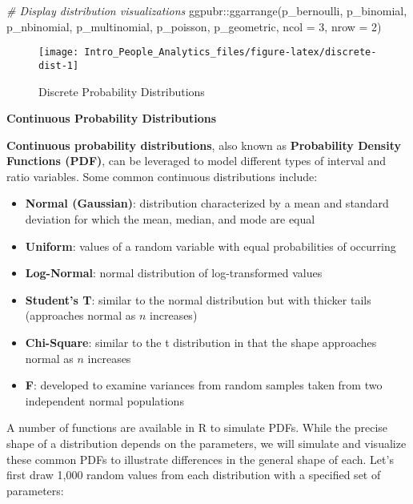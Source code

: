 \documentclass[
]{book}
\newenvironment{Shaded}{\begin{snugshade}}{\end{snugshade}}
\newcommand{\AttributeTok}[1]{\textcolor[rgb]{0.77,0.63,0.00}{#1}}
\newcommand{\CommentTok}[1]{\textcolor[rgb]{0.56,0.35,0.01}{\textit{#1}}}
\newcommand{\DecValTok}[1]{\textcolor[rgb]{0.00,0.00,0.81}{#1}}
\newcommand{\FunctionTok}[1]{\textcolor[rgb]{0.00,0.00,0.00}{#1}}
\newcommand{\NormalTok}[1]{#1}
\newcommand{\SpecialCharTok}[1]{\textcolor[rgb]{0.00,0.00,0.00}{#1}}
\providecommand{\tightlist}{%
  \setlength{\itemsep}{0pt}\setlength{\parskip}{0pt}}
\begin{document}
\begin{Shaded}
\begin{Highlighting}[]
\CommentTok{\# Display distribution visualizations}
\NormalTok{ggpubr}\SpecialCharTok{::}\FunctionTok{ggarrange}\NormalTok{(p\_bernoulli, p\_binomial, p\_nbinomial, p\_multinomial, p\_poisson, p\_geometric,}
          \AttributeTok{ncol =} \DecValTok{3}\NormalTok{, }\AttributeTok{nrow =} \DecValTok{2}\NormalTok{)}
\end{Highlighting}
\end{Shaded}

\begin{figure}

{\centering \texttt{[image: Intro\_People\_Analytics\_files/figure-latex/discrete-dist-1]} 

}

\caption{Discrete Probability Distributions}\label{fig:discrete-dist}
\end{figure}

\textbf{Continuous Probability Distributions}

\textbf{Continuous probability distributions}, also known as \textbf{Probability Density Functions (PDF)}, can be leveraged to model different types of interval and ratio variables. Some common continuous distributions include:

\begin{itemize}
\tightlist
\item
  \textbf{Normal (Gaussian)}: distribution characterized by a mean and standard deviation for which the mean, median, and mode are equal
\item
  \textbf{Uniform}: values of a random variable with equal probabilities of occurring
\item
  \textbf{Log-Normal}: normal distribution of log-transformed values
\item
  \textbf{Student's T}: similar to the normal distribution but with thicker tails (approaches normal as \(n\) increases)
\item
  \textbf{Chi-Square}: similar to the t distribution in that the shape approaches normal as \(n\) increases
\item
  \textbf{F}: developed to examine variances from random samples taken from two independent normal populations
\end{itemize}

A number of functions are available in R to simulate PDFs. While the precise shape of a distribution depends on the parameters, we will simulate and visualize these common PDFs to illustrate differences in the general shape of each. Let's first draw 1,000 random values from each distribution with a specified set of parameters:
\end{document}
